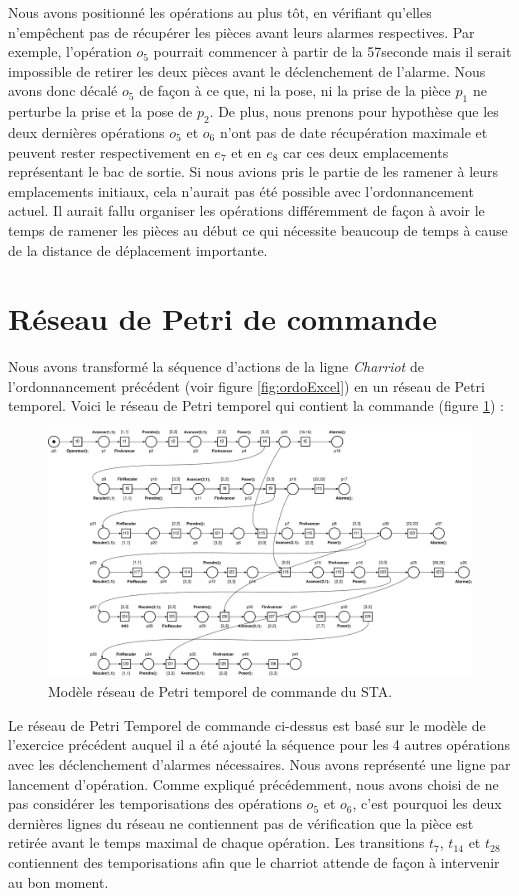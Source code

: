 Nous avons positionné les opérations au plus tôt, en vérifiant qu'elles n'empêchent pas de récupérer les pièces avant leurs alarmes respectives. Par exemple, l'opération $o_5$ pourrait commencer à partir de la 57\ieme seconde mais il serait impossible de retirer les deux pièces avant le déclenchement de l'alarme. Nous avons donc décalé $o_5$ de façon à ce que, ni la pose, ni la prise de la pièce $p_1$ ne perturbe la prise et la pose de $p_2$. De plus, nous prenons pour hypothèse que les deux dernières opérations $o_5$ et $o_6$ n'ont pas de date récupération maximale et peuvent rester respectivement en $e_7$ et en $e_8$ car ces deux emplacements représentant le bac de sortie. Si nous avions pris le partie de les ramener à leurs emplacements initiaux, cela n'aurait pas été possible avec l'ordonnancement actuel. Il aurait fallu organiser les opérations différemment de façon à avoir le temps de ramener les pièces au début ce qui nécessite beaucoup de temps à cause de la distance de déplacement importante.

\section{Réseau de Petri de commande}
Nous avons transformé la séquence d'actions de la ligne \emph{Charriot} de l'ordonnancement précédent (voir figure \ref{fig:ordoExcel}) en un réseau de Petri temporel. Voici le réseau de Petri temporel qui contient la commande (figure \ref{fig:III-3-rdptCom}) : 
\begin{figure}[!ht]
\centering
\includegraphics[width=\textwidth]{./III/images/reseau_Analyse--III-3.pdf}
\caption{\label{fig:III-3-rdptCom}Modèle réseau de Petri temporel de commande du STA.}
\end{figure}


Le réseau de Petri Temporel de commande ci-dessus est basé sur le modèle de l'exercice précédent auquel il a été ajouté la séquence pour les 4 autres opérations avec les déclenchement d'alarmes nécessaires. Nous avons représenté une ligne par lancement d'opération. Comme expliqué précédemment, nous avons choisi de ne pas considérer les temporisations des opérations $o_5$ et $o_6$, c'est pourquoi les deux dernières lignes du réseau ne contiennent pas de vérification que la pièce est retirée avant le temps maximal de chaque opération. Les transitions $t_7$, $t_{14}$ et $t_{28}$ contiennent des temporisations afin que le charriot attende de façon à intervenir au bon moment. 
